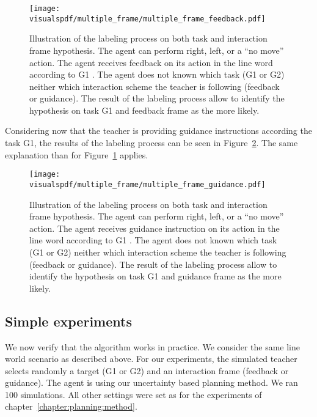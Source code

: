 \begin{figure}[!htbp]
\centering
\texttt{[image: \\visualspdf/multiple\_frame/multiple\_frame\_feedback.pdf]}
\caption{Illustration of the labeling process on both task and interaction frame hypothesis. The agent can perform right, left, or a ``no move'' action. The agent receives feedback on its action in the line word according to G1 . The agent does not known which task (G1 or G2) neither which interaction scheme the teacher is following (feedback or guidance). The result of the labeling process allow to identify the hypothesis on task G1 and feedback frame as the more likely.}
\label{fig:multipleframeexplainedfeedback}
\end{figure} 

\visuopti{\newpage}

Considering now that the teacher is providing guidance instructions according the task G1, the results of the labeling process can be seen in Figure~\ref{fig:multipleframeexplainedguidance}. The same explanation than for Figure~\ref{fig:multipleframeexplainedfeedback} applies. 

\begin{figure}[!htbp]
\centering
\texttt{[image: \\visualspdf/multiple\_frame/multiple\_frame\_guidance.pdf]}
\caption{Illustration of the labeling process on both task and interaction frame hypothesis. The agent can perform right, left, or a ``no move'' action. The agent receives guidance instruction on its action in the line word according to G1 . The agent does not known which task (G1 or G2) neither which interaction scheme the teacher is following (feedback or guidance). The result of the labeling process allow to identify the hypothesis on task G1 and guidance frame as the more likely.}
\label{fig:multipleframeexplainedguidance}
\end{figure} 

\subsection{Simple experiments}

We now verify that the algorithm works in practice. We consider the same line world scenario as described above. For our experiments, the simulated teacher selects randomly a target (G1 or G2) and an interaction frame (feedback or guidance). The agent is using our uncertainty based planning method. We ran 100 simulations. All other settings were set as for the experiments of chapter~\ref{chapter:planning:method}.

